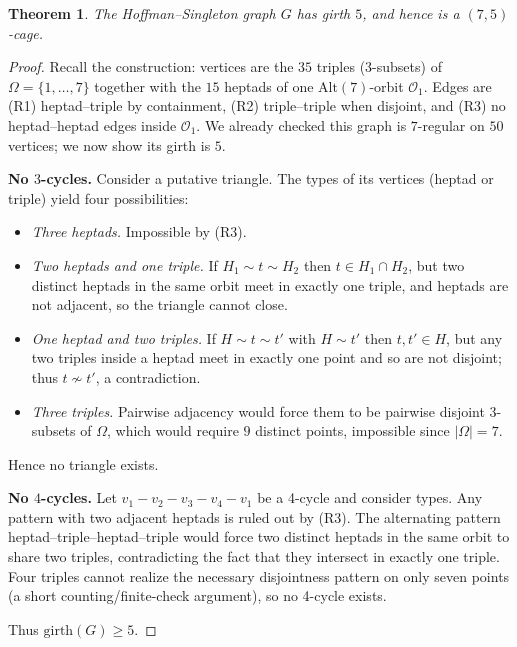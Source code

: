 \documentclass[12pt,a4paper,openany]{book}
\newtheorem{theorem}{Theorem}[section]
\begin{document}
\begin{theorem}
The Hoffman--Singleton graph $G$  has girth $5$, and hence is a $(7,5)$-cage.
\end{theorem}

\begin{proof}
Recall the construction: vertices are the $35$ triples (3-subsets) of
$\Omega=\{1,\dots,7\}$ together with the $15$ heptads of one
$\mathrm{Alt}(7)$-orbit $\mathcal O_1$. Edges are (R1) heptad--triple by
containment, (R2) triple--triple when disjoint, and (R3) no heptad--heptad
edges inside $\mathcal O_1$. We already checked this graph is $7$-regular on
$50$ vertices; we now show its girth is $5$.

\medskip\noindent\textbf{No $3$-cycles.}
Consider a putative triangle. The types of its vertices (heptad or triple)
yield four possibilities:

\begin{itemize}
  \item \emph{Three heptads.} Impossible by (R3).
  \item \emph{Two heptads and one triple.} If $H_1\sim t\sim H_2$ then
    $t\in H_1\cap H_2$, but two distinct heptads in the same orbit meet in
    exactly one triple, and heptads are not adjacent, so the triangle cannot close.
  \item \emph{One heptad and two triples.} If $H\sim t\sim t'$ with
    $H\sim t'$ then $t,t'\in H$, but any two triples inside a heptad meet
    in exactly one point and so are not disjoint; thus $t\not\sim t'$, a contradiction.
  \item \emph{Three triples.} Pairwise adjacency would force them to be
    pairwise disjoint 3-subsets of $\Omega$, which would require $9$ distinct
    points, impossible since $|\Omega|=7$.
\end{itemize}
Hence no triangle exists.

\medskip\noindent\textbf{No $4$-cycles.}
Let \(v_1-v_2-v_3-v_4-v_1\) be a 4-cycle and consider types. Any pattern with
two adjacent heptads is ruled out by (R3). The alternating pattern
heptad–triple–heptad–triple would force two distinct heptads in the same
orbit to share two triples, contradicting the fact that they intersect in
exactly one triple. Four triples cannot realize the necessary disjointness
pattern on only seven points (a short counting/finite-check argument), so no
4-cycle exists.

Thus $\mathrm{girth}(G)\ge 5$.


\end{proof}
\end{document}
